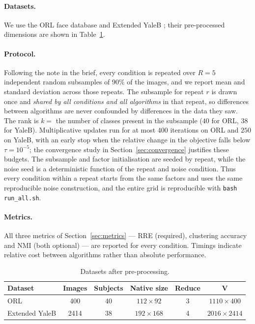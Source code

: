 \documentclass[12pt,a4paper]{article}
\newcommand{\bV}{\bm{V}}
\begin{document}
\paragraph{Datasets.} We use the ORL face database
\citep{samaria1994parameterisation} and Extended YaleB
\citep{georghiades2001few,lee2005acquiring}; their pre-processed dimensions
are shown in Table~\ref{tab:datasets}.

\paragraph{Protocol.} Following the note in the brief, every condition is
repeated over $R=5$ independent random subsamples of $90\%$ of the images, and
we report mean and standard deviation across those repeats. The subsample for repeat $r$ is drawn once and \emph{shared by all
conditions and all algorithms} in that repeat, so differences between
algorithms are never confounded by differences in the data they saw. The rank
is $k = $ the number of classes present in the subsample ($40$ for ORL, $38$
for YaleB). Multiplicative updates run for at most $400$ iterations on ORL and
$250$ on YaleB, with an early stop when the relative change in the objective
falls below $\tau = 10^{-5}$; the convergence study in
Section~\ref{sec:convergence} justifies these budgets. The subsample and factor
initialisation are seeded by repeat, while the noise seed is a deterministic
function of the repeat and noise condition. Thus every condition within a
repeat starts from the same factors and uses the same reproducible noise
construction, and the entire grid is reproducible with
\texttt{bash run\_all.sh}.

\paragraph{Metrics.} All three metrics of Section~\ref{sec:metrics} --- RRE
(required), clustering accuracy and NMI (both optional) --- are reported for
every condition. Timings indicate relative cost between algorithms rather than
absolute performance.

\begin{table}[tbp]
  \centering
  \caption{Datasets after pre-processing.}
  \label{tab:datasets}
  \small
  \begin{tabular}{lccccc}
    \toprule
    Dataset & Images & Subjects & Native size & Reduce & $\bV$ \\
    \midrule
    ORL            & 400  & 40 & $112\times 92$  & 3 & $1110 \times 400$ \\
    Extended YaleB & 2414 & 38 & $192\times 168$ & 4 & $2016 \times 2414$ \\
    \bottomrule
  \end{tabular}
\end{table}
\end{document}
